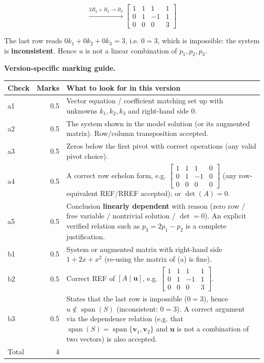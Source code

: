 \documentclass[11pt,a4paper]{article}
\newcommand{\Conclude}[1]{\par\noindent\fcolorbox{WorkBlue}{blue!4}{\textbf{\textcolor{WorkBlue}{#1}}}\par}
\begin{document}
{\[  \xrightarrow{2R_2+R_3 \to R_3} \left[\begin{array}{ccc|c} 1 & 1 & 1 & 1 \\ 0 & 1 & -1 & 1 \\ 0 & 0 & 0 & 3 \end{array}\right] \]

The last row reads $0k_1+0k_2+0k_3=3$, i.e. $0=3$, which is impossible: the system is \textbf{inconsistent}. Hence $u$ is not a linear combination of $p_1,p_2,p_3$.

\Conclude{$u\notin\operatorname{span}(S)$.}}
\textbf{Version-specific marking guide.}\par
\begin{tabularx}{\linewidth}{@{}l r X@{}}\toprule Check & Marks & What to look for in this version\\\midrule
a1 & 0.5 & Vector equation / coefficient matching set up with unknowns $k_1,k_2,k_3$ and right-hand side $0$.\\
a2 & 0.5 & The system shown in the model solution (or its augmented matrix). Row/column transposition accepted.\\
a3 & 0.5 & Zeros below the first pivot with correct operations (any valid pivot choice).\\
a4 & 0.5 & A correct row echelon form, e.g. $\left[\begin{array}{ccc|c} 1 & 1 & 1 & 0 \\ 0 & 1 & -1 & 0 \\ 0 & 0 & 0 & 0 \end{array}\right]$ (any row-equivalent REF/RREF accepted); or $\det(A)=0$.\\
a5 & 0.5 & Conclusion \textbf{linearly dependent} with reason (zero row / free variable / nontrivial solution / $\det=0$). An explicit verified relation such as $p_3=2p_1-p_2$ is a complete justification.\\
b1 & 0.5 & System or augmented matrix with right-hand side $1+2x+x^{2}$ (re-using the matrix of (a) is fine).\\
b2 & 0.5 & Correct REF of $[A\mid\mathbf{u}]$, e.g. $\left[\begin{array}{ccc|c} 1 & 1 & 1 & 1 \\ 0 & 1 & -1 & 1 \\ 0 & 0 & 0 & 3 \end{array}\right]$.\\
b3 & 0.5 & States that the last row is impossible ($0=3$), hence $u\notin\operatorname{span}(S)$ (inconsistent: $0=3$). A correct argument via the dependence relation (e.g. that $\operatorname{span}(S)=\operatorname{span}\{\mathbf{v}_1,\mathbf{v}_2\}$ and $\mathbf{u}$ is not a combination of two vectors) is also accepted.\\
\midrule Total & 4 & \\\bottomrule\end{tabularx}
\end{document}
